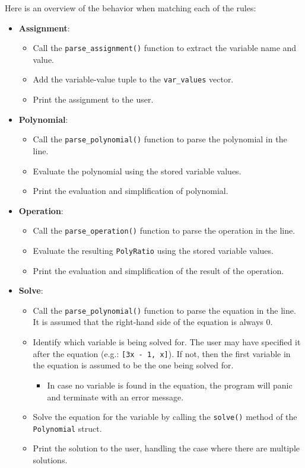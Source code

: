 Here is an overview of the behavior when matching each of the rules:
\begin{itemize}
    \item \textbf{Assignment}:
    \begin{itemize}
        \item Call the \verb|parse_assignment()| function to extract the variable name and value.
        \item Add the variable-value tuple to the \verb|var_values| vector.
        \item Print the assignment to the user.
    \end{itemize}
    \item \textbf{Polynomial}:
    \begin{itemize}
        \item Call the \verb|parse_polynomial()| function to parse the polynomial in the line.
        \item Evaluate the polynomial using the stored variable values.
        \item Print the evaluation and simplification of polynomial.
    \end{itemize}
    \item \textbf{Operation}:
    \begin{itemize}
        \item Call the \verb|parse_operation()| function to parse the operation in the line.
        \item Evaluate the resulting \verb|PolyRatio| using the stored variable values.
        \item Print the evaluation and simplification of the result of the operation.
    \end{itemize}
    \item \textbf{Solve}:
    \begin{itemize}
        \item Call the \verb|parse_polynomial()| function to parse the equation in the line. It is assumed that the right-hand side of the equation is always $0$.
        \item Identify which variable is being solved for. The user may have specified it after the equation (e.g.: \texttt{[3x - 1, x]}). If not, then the first variable in the equation is assumed to be the one being solved for.
        \begin{itemize}
            \item In case no variable is found in the equation, the program will panic and terminate with an error message. 
        \end{itemize}
        \item Solve the equation for the variable by calling the \verb|solve()| method of the \verb|Polynomial| struct.
        \item Print the solution to the user, handling the case where there are multiple solutions.
    \end{itemize}
\end{itemize}

